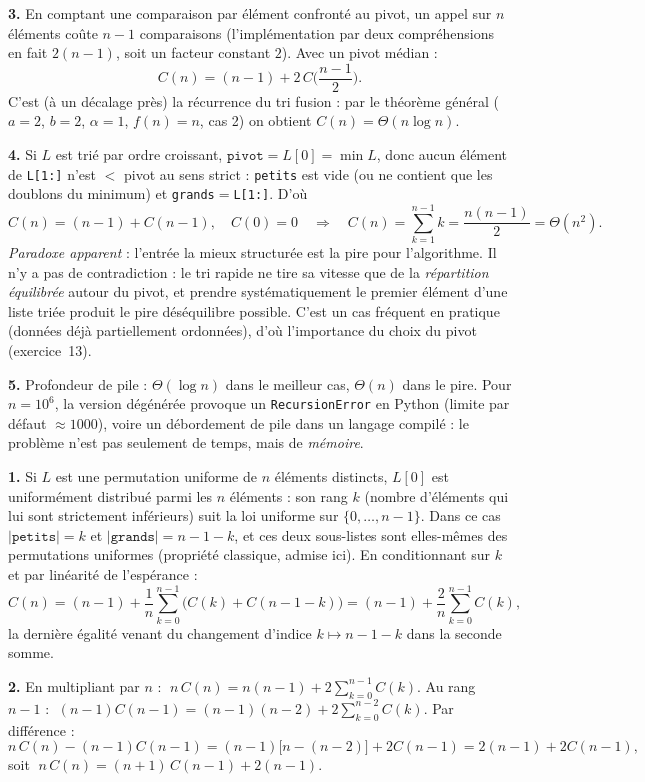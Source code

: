 \documentclass[11pt,a4paper]{article}
\begin{document}
\textbf{3.} En comptant une comparaison par élément confronté au pivot, un appel sur $n$
éléments coûte $n-1$ comparaisons (l'implémentation par deux compréhensions en fait
$2(n-1)$, soit un facteur constant $2$). Avec un pivot médian :
\[
  C(n)=(n-1)+2\,C\!\Big(\frac{n-1}{2}\Big).
\]
C'est (à un décalage près) la récurrence du tri fusion : par le théorème général
($a=2$, $b=2$, $\alpha=1$, $f(n)=n$, cas 2) on obtient $C(n)=\Theta(n\log n)$.

\textbf{4.} Si $L$ est trié par ordre croissant, $\texttt{pivot}=L[0]=\min L$, donc
aucun élément de \texttt{L[1:]} n'est $<$ pivot au sens strict : \texttt{petits} est vide
(ou ne contient que les doublons du minimum) et \texttt{grands}$=$\texttt{L[1:]}. D'où
\[
  C(n)=(n-1)+C(n-1),\quad C(0)=0 \quad\Longrightarrow\quad
  C(n)=\sum_{k=1}^{n-1}k=\frac{n(n-1)}{2}=\Theta(n^{2}).
\]
\emph{Paradoxe apparent} : l'entrée la mieux structurée est la pire pour l'algorithme.
Il n'y a pas de contradiction : le tri rapide ne tire sa vitesse que de la
\emph{répartition équilibrée} autour du pivot, et prendre systématiquement le premier
élément d'une liste triée produit le pire déséquilibre possible. C'est un cas fréquent en
pratique (données déjà partiellement ordonnées), d'où l'importance du choix du pivot
(exercice~13).

\textbf{5.} Profondeur de pile : $\Theta(\log n)$ dans le meilleur cas,
$\Theta(n)$ dans le pire. Pour $n=10^{6}$, la version dégénérée provoque un
\texttt{RecursionError} en Python (limite par défaut $\approx1000$), voire un
débordement de pile dans un langage compilé : le problème n'est pas seulement de temps,
mais de \emph{mémoire}.

\reponse
\textbf{1.} Si $L$ est une permutation uniforme de $n$ éléments distincts, $L[0]$ est
uniformément distribué parmi les $n$ éléments : son rang $k$ (nombre d'éléments qui lui
sont strictement inférieurs) suit la loi uniforme sur $\{0,\dots,n-1\}$. Dans ce cas
$|\texttt{petits}|=k$ et $|\texttt{grands}|=n-1-k$, et ces deux sous-listes sont
elles-mêmes des permutations uniformes (propriété classique, admise ici). En
conditionnant sur $k$ et par linéarité de l'espérance :
\[
  C(n)=(n-1)+\frac1n\sum_{k=0}^{n-1}\big(C(k)+C(n-1-k)\big)
      =(n-1)+\frac2n\sum_{k=0}^{n-1}C(k),
\]
la dernière égalité venant du changement d'indice $k\mapsto n-1-k$ dans la seconde somme.

\textbf{2.} En multipliant par $n$ :
$\;n\,C(n)=n(n-1)+2\sum_{k=0}^{n-1}C(k)$.
Au rang $n-1$ :
$\;(n-1)C(n-1)=(n-1)(n-2)+2\sum_{k=0}^{n-2}C(k)$.
Par différence :
\[
  n\,C(n)-(n-1)C(n-1) = (n-1)\big[n-(n-2)\big]+2C(n-1) = 2(n-1)+2C(n-1),
\]
soit $\;\boxed{n\,C(n)=(n+1)\,C(n-1)+2(n-1)}$.
\end{document}
